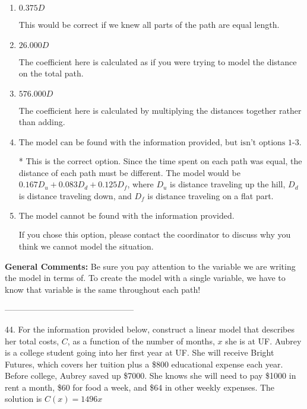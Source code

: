 \documentclass{extbook}[14pt]
\begin{document}
\begin{enumerate}[label=\Alph*.] 
\item $ 0.375 D $ 

 This would be correct if we knew all parts of the path are equal length. 
\item $ 26.000 D $ 

 The coefficient here is calculated as if you were trying to model the distance on the total path. 
\item $ 576.000 D $ 

 The coefficient here is calculated by multiplying the distances together rather than adding. 
\item $ \text{The model can be found with the information provided, but isn't options 1-3.} $ 

 * This is the correct option. Since the time spent on each path was equal, the distance of each path must be different. The model would be $0.167D_u + 0.083D_d + 0.125D_f$, where $D_u$ is distance traveling up the hill, $D_d$ is distance traveling down, and $D_f$ is distance traveling on a flat part. 
\item $ \text{The model cannot be found with the information provided.} $ 

 If you chose this option, please contact the coordinator to discuss why you think we cannot model the situation. 
\end{enumerate} 
 
\textbf{General Comments:} Be sure you pay attention to the variable we are writing the model in terms of. To create the model with a single variable, we have to know that variable is the same throughout each path!

-----------------------------------------------

44. For the information provided below, construct a linear model that describes her total costs, $C$, as a function of the number of months, $x$ she is at UF. 
Aubrey is a college student going into her first year at UF. She will receive Bright Futures, which covers her tuition plus a \$800 educational expense each year. Before college, Aubrey saved up \$7000. She knows she will need to pay \$1000 in rent a month, \$60 for food a week, and \$64 in other weekly expenses. 
The solution is $ C(x) = 1496 x $ 
\end{document}

